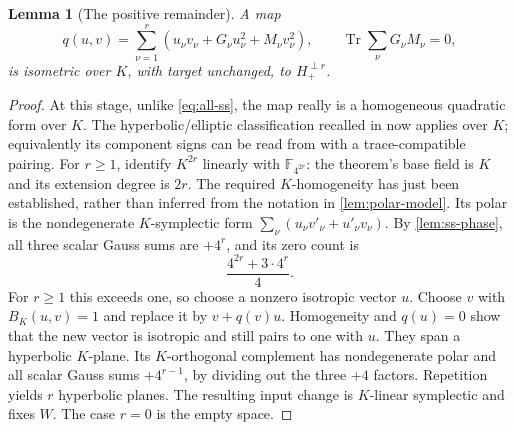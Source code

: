 \documentclass[11pt,a4paper]{article}
\newtheorem{lemma}[theorem]{Lemma}
\theoremstyle{definition}
\theoremstyle{remark}
\numberwithin{equation}{section}
\newcommand{\F}{\mathbb F}
\newcommand{\Tr}{\operatorname{Tr}}
\newcommand{\Hp}{H_+}
\begin{document}
\begin{lemma}[The positive remainder]\label{lem:hyperbolic}
A map
\begin{equation}\label{eq:positive-remainder}
 q(u,v)=\sum_{\nu=1}^r
 (u_\nu v_\nu+G_\nu u_\nu^2+M_\nu v_\nu^2),\qquad
 \Tr\sum_\nu G_\nu M_\nu=0,
\end{equation}
is isometric over \(K\), with target unchanged, to
\(\Hp^{\perp r}\).
\end{lemma}
\begin{proof}
At this stage, unlike \eqref{eq:all-ss}, the map really is a
homogeneous quadratic form over \(K\).
The hyperbolic/elliptic classification recalled in \citep[p.~509]{AFH24}
now applies over \(K\); equivalently its component signs can be read
from \citep[Theorem 2.2, pp.~511--512]{AFH24} with a trace-compatible
pairing. For \(r\geq1\), identify \(K^{2r}\) linearly with
\(\F_{4^{2r}}\): the theorem's base field is \(K\) and its extension
degree is \(2r\). The required \(K\)-homogeneity has just been established,
rather than inferred from the notation in \cref{lem:polar-model}.
Its polar is the nondegenerate \(K\)-symplectic form
\(\sum_\nu(u_\nu v'_\nu+u'_\nu v_\nu)\).
By \cref{lem:ss-phase}, all three scalar Gauss sums are
\(+4^r\), and its zero count is
\[
 \frac{4^{2r}+3\cdot4^r}{4}.
\]
For \(r\geq1\) this exceeds one, so choose a nonzero isotropic vector
\(u\). Choose \(v\) with \(B_K(u,v)=1\) and replace it by
\(v+q(v)u\). Homogeneity and \(q(u)=0\) show that the new vector is
isotropic and still pairs to one with \(u\). They span a hyperbolic
\(K\)-plane. Its \(K\)-orthogonal complement has nondegenerate polar
and all scalar Gauss sums \(+4^{r-1}\), by dividing out the three
\(+4\) factors. Repetition yields \(r\) hyperbolic planes.
The resulting input change is \(K\)-linear symplectic and fixes \(W\).
The case \(r=0\) is the empty space.
\end{proof}
\end{document}
